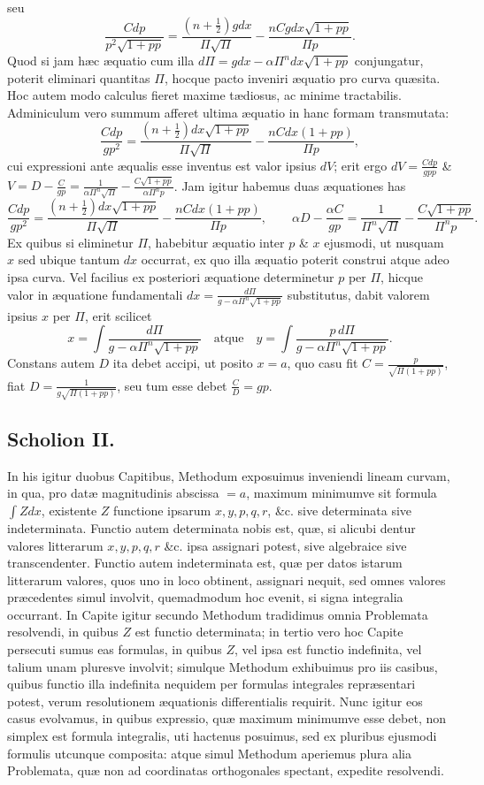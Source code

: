 seu
\[
\frac{Cdp}{p^2\sqrt{1+pp}}=\frac{(n+\frac12)gdx}{\Pi\sqrt\Pi}-\frac{nCgdx\sqrt{1+pp}}{\Pi p}.
\]
Quod si jam hæc æquatio cum illa $d\Pi=gdx-\alpha\Pi^n dx\sqrt{1+pp}$ conjungatur, poterit eliminari quantitas $\Pi$, hocque pacto inveniri æquatio pro curva quæsita. Hoc autem modo calculus fieret maxime tædiosus, ac minime tractabilis. Adminiculum vero summum afferet ultima æquatio in hanc formam transmutata:
\[
\frac{Cdp}{gp^2}=\frac{(n+\frac12)dx\sqrt{1+pp}}{\Pi\sqrt\Pi}-\frac{nCdx(1+pp)}{\Pi p},
\]
cui expressioni ante æqualis esse inventus est valor ipsius $dV$; erit ergo $dV=\frac{Cdp}{gpp}$ \& $V=D-\frac{C}{gp}=\frac{1}{\alpha\Pi^n\sqrt\Pi}-\frac{C\sqrt{1+pp}}{\alpha\Pi^n p}$. Jam igitur habemus duas æquationes has
\[
\frac{Cdp}{gp^2}=\frac{(n+\frac12)dx\sqrt{1+pp}}{\Pi\sqrt\Pi}-\frac{nCdx(1+pp)}{\Pi p},
\qquad\alpha D-\frac{\alpha C}{gp}=\frac1{\Pi^n\sqrt\Pi}-\frac{C\sqrt{1+pp}}{\Pi^n p}.
\]
Ex quibus si eliminetur $\Pi$, habebitur æquatio inter $p$ \& $x$ ejusmodi, ut nusquam $x$ sed ubique tantum $dx$ occurrat, ex quo illa æquatio poterit construi atque adeo ipsa curva. Vel facilius ex posteriori æquatione determinetur $p$ per $\Pi$, hicque valor in æquatione fundamentali $dx=\frac{d\Pi}{g-\alpha\Pi^n\sqrt{1+pp}}$ substitutus, dabit valorem ipsius $x$ per $\Pi$, erit scilicet
\[
x=\int\frac{d\Pi}{g-\alpha\Pi^n\sqrt{1+pp}}\quad\text{atque}\quad y=\int\frac{p\,d\Pi}{g-\alpha\Pi^n\sqrt{1+pp}}.
\]
Constans autem $D$ ita debet accipi, ut posito $x=a$, quo casu fit $C=\frac{p}{\sqrt{\Pi(1+pp)}}$, fiat $D=\frac{1}{g\sqrt{\Pi(1+pp)}}$, seu tum esse debet $\frac{C}{D}=gp$.
\subsection*{Scholion II.}
 In his igitur duobus Capitibus, Methodum exposuimus inveniendi lineam curvam, in qua, pro datæ magnitudinis abscissa $=a$, maximum minimumve sit formula $\int Zdx$, existente $Z$ functione ipsarum $x,y,p,q,r$, \&c. sive determinata sive indeterminata. Functio autem determinata nobis est, quæ, si alicubi dentur valores litterarum $x,y,p,q,r$ \&c. ipsa assignari potest, sive algebraice sive transcendenter. Functio autem indeterminata est, quæ per datos istarum litterarum valores, quos uno in loco obtinent, assignari nequit, sed omnes valores præcedentes simul involvit, quemadmodum hoc evenit, si signa integralia occurrant. In Capite igitur secundo Methodum tradidimus omnia Problemata resolvendi, in quibus $Z$ est functio determinata; in tertio vero hoc Capite persecuti sumus eas formulas, in quibus $Z$, vel ipsa est functio indefinita, vel talium unam pluresve involvit; simulque Methodum exhibuimus pro iis casibus, quibus functio illa indefinita nequidem per formulas integrales repræsentari potest, verum resolutionem æquationis differentialis requirit. Nunc igitur eos casus evolvamus, in quibus expressio, quæ maximum minimumve esse debet, non simplex est formula integralis, uti hactenus posuimus, sed ex pluribus ejusmodi formulis utcunque composita: atque simul Methodum aperiemus plura alia Problemata, quæ non ad coordinatas orthogonales spectant, expedite resolvendi.
